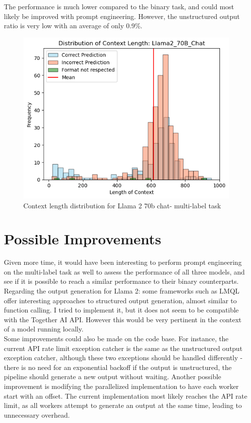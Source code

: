 \documentclass[11pt]{article}
\begin{document}
The performance is much lower compared to the binary task, and could most likely be improved with prompt engineering. However, the unstructured output ratio is very low with an average of only 0.9\%.

\begin{figure}[h]
    \centering
    \includegraphics[width=0.45\linewidth]{images/llama2/multilabel/llama2_context_length.png}
    \caption{Context length distribution for Llama 2 70b chat- multi-label task}
    \label{fig:enter-label}
\end{figure}


\section{Possible Improvements}

Given more time, it would have been interesting to perform prompt engineering on the multi-label task as well to assess the performance of all three models, and see if it is possible to reach a similar performance to their binary counterparts.\\

Regarding the output generation for Llama 2: some frameworks such as LMQL offer interesting approaches to structured output generation, almost similar to function calling. I tried to implement it, but it does not seem to be compatible with the Together AI API. However this would be very pertinent in the context of a model running locally.\\

Some improvements could also be made on the code base. For instance, the current API rate limit exception catcher is the same as the unstructured output exception catcher, although these two exceptions should be handled differently - there is no need for an exponential backoff if the output is unstructured, the pipeline should generate a new output without waiting. Another possible improvement is modifying the parallelized implementation to have each worker start with an offset. The current implementation most likely reaches the API rate limit, as all workers attempt to generate an output at the same time, leading to unnecessary overhead.\\
\end{document}
